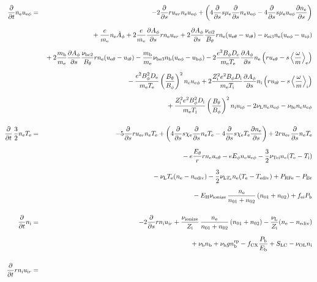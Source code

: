 \documentclass[11pt]{article}
\def\r#1{{\rm#1}}
\def\ddt{\frac{\partial}{\partial t}}
\def\dds{\frac{\partial}{\partial s}}
\def\dd#1{\frac{\partial #1}{\partial s}}
\def\ave#1{\left\langle#1\right\rangle}
\def\me{m_\r{e}}
\def\mb{m_\r{b}}
\def\mue{\mu_\r{e}}
\def\De{D_\r{e}}
\def\Di{D_\r{i}}
\def\chie{\chi_\r{e}}
\def\ne{n_\r{e}}
\def\ni{n_\r{i}}
\def\nb{n_\r{b}}
\def\uer{u_{\r{e}r}}
\def\uir{u_{\r{i}r}}
\def\ueth{u_{\r{e}\theta}}
\def\uith{u_{\r{i}\theta}}
\def\ueph{u_{\r{e}\phi}}
\def\uiph{u_{\r{i}\phi}}
\def\ubph{u_{\r{b}\phi}}
\def\Eth{E_\theta}
\def\Eph{E_\phi}
\def\Bth{B_\theta}
\def\Bph{B_\phi}
\def\Aphd{\dot{A}_\phi}
\def\Aph{A_\phi}
\def\Te{T_\r{e}}
\def\Ti{T_\r{i}}
\def\nna{n_{01}}
\def\nnb{n_{02}}
\def\Zi{Z_\r{i}}
\def\Pb{P_\r{b}}
\def\Eb{E_\r{b}}
\def\PRFe{P_\r{RFe}}
\def\PBr{P_\r{Br}}
\def\EH{E_\r{H}}
\def\fei{f_\r{ei}}
\def\nbrp{n_\r{b}^\r{rp}}
\def\fCX{f_\r{CX}}
\def\nube{\nu_\r{be}}
\def\nune{\nu_\r{0e}}
\def\nuL{\nu_\r{L}}
\def\nuion{\nu_\r{ionize}}
\def\nub{\nu_\r{b}}
\def\nuTei{\nu_\r{Tei}}
\def\vb{v_\r{b}}
\def\nediv{n_\r{ediv}}
\def\Tediv{T_\r{ediv}}
\def\nuLTe{\nu_{\r{L}T_\r{e}}}
\def\nuOL{\nu_\r{OL}}
\begin{document}
\begin{eqnarray}
%
%
\\[5mm]
%
%
  \ddt \ne \ueph &=&
%
  - 2 \dds r \uer \ne \ueph
%
  + \left(   4 \dds s \mue \dds \ne \ueph
%
           - 4 \dds s \mue \ueph \dd{\ne} \right)
\nonumber\\[2.5mm]&&{}
%
  + \frac{e}{\me} \ne \Aphd
%
  + 2 \frac{e}{\me} \dd{\Aph} r \ne \uer 
%
  + 2 \dd{\Aph} \frac{\nu_\r{ei2}}{\Bth} r \ne (\ueth - \uith)
%
  - \nu_\r{ei3} \ne (\ueph - \uiph)
\nonumber\\[2.5mm]&&{}
%
  + 2 \frac{\mb}{\me} \dd{\Aph} \frac{\nu_\r{be2}}{\Bth} r \ne (\ueth - \uith)
%
  - \frac{\mb}{\me} \nu_\r{be3} \nb (\ueph - \ubph)
%
  - 2\frac{e^2 \Bph \De}{\me\Te}\dd{\Aph}\ne
    \left(r \ueth - s \ave{\frac{\omega}{m}}_\r{e} \right)
\nonumber\\[2.5mm]&&{}
%
  - \frac{e^2 \Bph^2 \De}{\me\Te}\left(\frac{\Bth}{\Bph}\right)^2\ne\ueph
%
   + 2\frac{\Zi^2 e^2 \Bph \Di}{\me\Ti}\dd{\Aph}\ni
    \left(r \uith - s \ave{\frac{\omega}{m}}_\r{i} \right)
\nonumber\\[2.5mm]&&{}
%
   + \frac{\Zi^2 e^2 \Bph^2
   \Di}{\me\Ti}\left(\frac{\Bth}{\Bph}\right)^2\ni\uiph
%
  - 2 \nuL \ne \ueph
%
  - \nune \ne \ueph
%
%
\\[5mm]
%
%
  \ddt \, \frac{3}{2} \ne \Te &=&
%
   - 5 \dds r \uer \ne \Te
%
   + \left(   4 \dds s \chie \dds \ne \Te
%
            - 4 \dds s \chie \Te \dd{\ne} \right)
%
  + 2 r \uer \dds \ne \Te
%
\nonumber\\[2.5mm]&&{}
%
  -  e \frac{\Eth}{r} r \ne \ueth
%
  -  e \Eph \ne \ueph 
%
  - \frac{3}{2} \nuTei \ne (\Te - \Ti)
%
%
\nonumber\\[2.5mm]&&{}
%
  - \nuL \Te (\ne - \nediv)
%
  - \frac{3}{2} \nuLTe \ne (\Te - \Tediv)
%
  + \PRFe
%
  - \PBr
\nonumber\\[2.5mm]&&{}
%
  - \EH \nuion\, \frac{\ne}{\nna+\nnb}\, (\nna+\nnb)
%
  + \fei \Pb
\\[5mm]
%
%
  \ddt \ni &=&
%
  - 2 \dds r \ni \uir
%
  + \frac{\nuion}{\Zi}\, \frac{\ne}{\nna+\nnb}\, (\nna+\nnb)
%
  - \frac{\nuL}{\Zi} (\ne - \nediv) 
\nonumber\\[2.5mm]&&{}
%
  + \nub \nb
%
  + \nub g \nbrp
%
  - \fCX \frac{\Pb}{\Eb}
%
  + S_\r{LC}
%
  - \nuOL \ni
\\[5mm]
%
%
  \ddt r \ni \uir &=&

\end{eqnarray}
\end{document}
